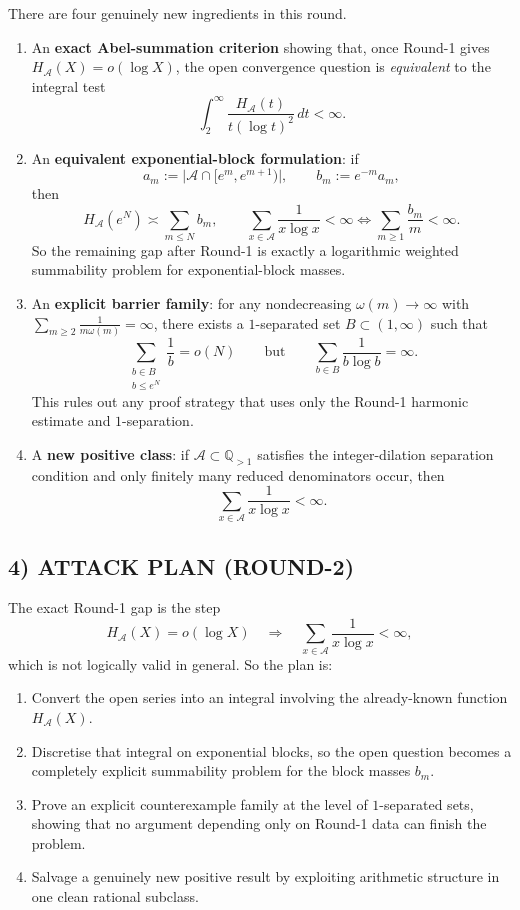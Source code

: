 There are four genuinely new ingredients in this round.

\begin{enumerate}
\item An \textbf{exact Abel-summation criterion} showing that, once Round-1 gives
$H_{\mathcal A}(X)=o(\log X)$, the open convergence question is \emph{equivalent} to the integral test
\[
\int_2^\infty \frac{H_{\mathcal A}(t)}{t(\log t)^2}\,dt<\infty.
\]
\item An \textbf{equivalent exponential-block formulation}: if
\[
a_m:=\bigl|\mathcal A\cap [e^m,e^{m+1})\bigr|,\qquad b_m:=e^{-m}a_m,
\]
then
\[
H_{\mathcal A}(e^N)\asymp \sum_{m\le N} b_m,
\qquad
\sum_{x\in\mathcal A}\frac{1}{x\log x}<\infty
\iff
\sum_{m\ge 1}\frac{b_m}{m}<\infty.
\]
So the remaining gap after Round-1 is exactly a logarithmic weighted summability problem for
exponential-block masses.
\item An \textbf{explicit barrier family}: for any nondecreasing $\omega(m)\to\infty$ with
$\sum_{m\ge 2}\frac{1}{m\omega(m)}=\infty$, there exists a $1$-separated set
$B\subset (1,\infty)$ such that
\[
\sum_{\substack{b\in B\\ b\le e^N}}\frac1b=o(N)
\qquad\text{but}\qquad
\sum_{b\in B}\frac{1}{b\log b}=\infty.
\]
This rules out any proof strategy that uses only the Round-1 harmonic estimate and $1$-separation.
\item A \textbf{new positive class}: if $\mathcal A\subset \mathbb Q_{>1}$ satisfies the
integer-dilation separation condition and only finitely many reduced denominators occur, then
\[
\sum_{x\in\mathcal A}\frac{1}{x\log x}<\infty.
\]
\end{enumerate}

\subsection*{4) ATTACK PLAN (ROUND-2)}

The exact Round-1 gap is the step
\[
H_{\mathcal A}(X)=o(\log X)\quad \Longrightarrow\quad
\sum_{x\in\mathcal A}\frac{1}{x\log x}<\infty,
\]
which is not logically valid in general. So the plan is:

\begin{enumerate}
\item Convert the open series into an integral involving the already-known function $H_{\mathcal A}(X)$.
\item Discretise that integral on exponential blocks, so the open question becomes a completely explicit
summability problem for the block masses $b_m$.
\item Prove an explicit counterexample family at the level of $1$-separated sets, showing that no argument
depending only on Round-1 data can finish the problem.
\item Salvage a genuinely new positive result by exploiting arithmetic structure in one clean rational subclass.
\end{enumerate}

